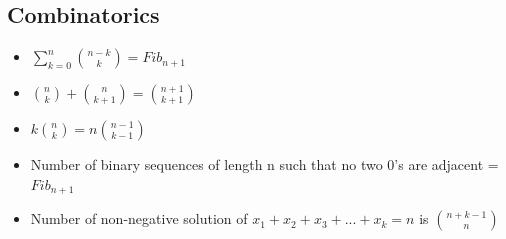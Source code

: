 \subsection{Combinatorics}
\vspace{2.5mm}
\begin{itemize}
    \item \begin{math}
              \sum\limits_{k =0}^n\binom{n-k}{k} = Fib_{n+1}
          \end{math}

    \item \begin{math}
              \binom{n}{k} + \binom{n}{k+1} = \binom{n+1}{k+1}
          \end{math}

    \item \begin{math}
              k \binom{n}{k}  = n\binom{n-1}{k-1}
          \end{math}
    \item Number of binary sequences of length n such that no two 0's are adjacent =
          $Fib_{n+1}$
    \item Number of non-negative solution of $x_1 + x_2 + x_3 + ... + x_k = n$ is
          $\binom{n+k-1}{n}$
\end{itemize}
